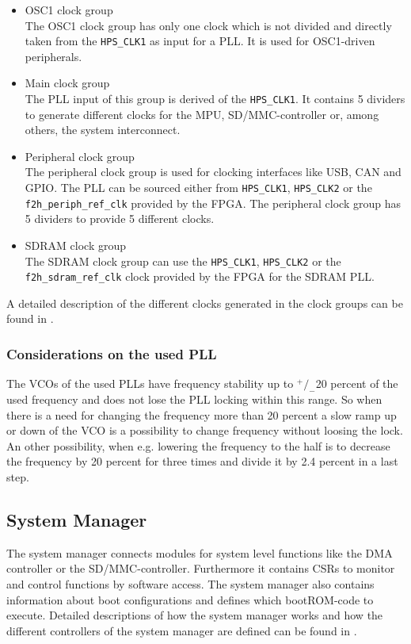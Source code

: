 \begin{itemize}
\item OSC1 clock group\\
The OSC1 clock group has only one clock which is not divided and directly taken from the \texttt{HPS\_CLK1} as input for a PLL. It is used for OSC1-driven peripherals.
\item Main clock group\\
The PLL input of this group is derived of the \texttt{HPS\_CLK1}. It contains 5 dividers to generate different clocks for the MPU, SD/MMC-controller or, among others, the system interconnect.
\item Peripheral clock group\\
The peripheral clock group is used for clocking interfaces like USB, CAN and GPIO. The PLL can be sourced either from \texttt{HPS\_CLK1}, \texttt{HPS\_CLK2} or the \texttt{f2h\_periph\_ref\_clk} provided by the FPGA. The peripheral clock group has 5 dividers to provide 5 different clocks.
\item SDRAM clock group\\
The SDRAM clock group can use the  \texttt{HPS\_CLK1}, \texttt{HPS\_CLK2} or the \texttt{f2h\_sdram\_ref\_clk} clock provided by the FPGA for the SDRAM PLL.
\end{itemize}
A detailed description of the different clocks generated in the clock groups can be found in \cite[chapter 2]{AlteraHPS15}.
\subsubsection{Considerations on the used PLL}
The VCOs of the used PLLs have frequency stability up to $\newcommand*\rfrac[2]{{}^{#1}\!/_{#2}}
\rfrac{+}{-}$20 percent of the used frequency and does not lose the PLL locking within this range. So when there is a need for changing the frequency more than 20 percent a slow ramp up or down of the VCO is a possibility to change frequency without loosing the lock. An other possibility, when e.g. lowering the frequency to the half is to decrease the frequency by 20 percent for three times and divide it by 2.4 percent in a last step.
\subsection{System Manager}
The system manager connects modules for system level functions like the DMA controller or the SD/MMC-controller. Furthermore it contains CSRs to monitor and control functions by software access. The system manager also contains information about boot configurations and defines which bootROM-code to execute. Detailed descriptions of how the system manager works and how the different controllers of the system manager are defined can be found in \cite[chapter 5]{AlteraHPS15}.
